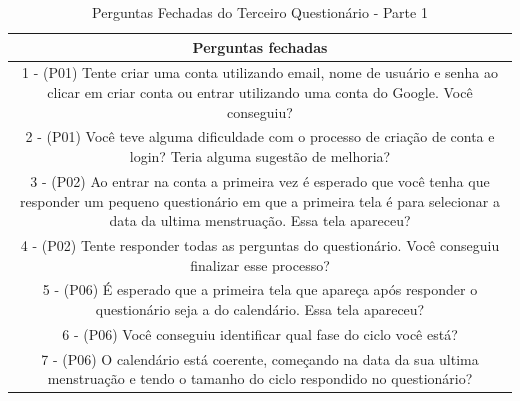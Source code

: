 \begin{table}[ht]
    \centering
    \caption{Perguntas Fechadas do Terceiro Questionário - Parte 1}
    \label{tab15}
    \begin{tabular}{c}
        \toprule
        \textbf{Perguntas fechadas} \\
        \midrule
        \begin{minipage} [t] {1\textwidth} 1 - (P01) Tente criar uma conta utilizando email, nome de usuário e senha ao clicar em criar conta ou entrar utilizando uma conta do Google. Você conseguiu?
        \end{minipage} \\
        \midrule
        \begin{minipage} [t] {1\textwidth} 2 - (P01) Você teve alguma dificuldade com o processo de criação de conta e login? Teria alguma sugestão de melhoria?
        \end{minipage}\\
        \midrule
        \begin{minipage} [t] {1\textwidth} 3 - (P02) Ao entrar na conta a primeira vez é esperado que você tenha que responder um pequeno questionário em que a primeira tela é para selecionar a data da ultima menstruação. Essa tela apareceu? \end{minipage} \\
        \midrule
        \begin{minipage} [t] {1\textwidth} 4 - (P02) Tente responder todas as perguntas do questionário. Você conseguiu finalizar esse processo? \end{minipage}  \\
        \midrule
        \begin{minipage} [t] {1\textwidth} 5 - (P06) É esperado que a primeira tela que apareça após responder o questionário seja a do calendário. Essa tela apareceu? \end{minipage}\\
        \midrule
        \begin{minipage} [t] {1\textwidth} 6 - (P06) Você conseguiu identificar qual fase do ciclo você está? \end{minipage} \\
        \midrule
        \begin{minipage} [t] {1\textwidth} 7 - (P06) O calendário está coerente, começando na data da sua ultima menstruação e tendo o tamanho do ciclo respondido no questionário? \end{minipage}\\

\end{tabular}
\end{table}
